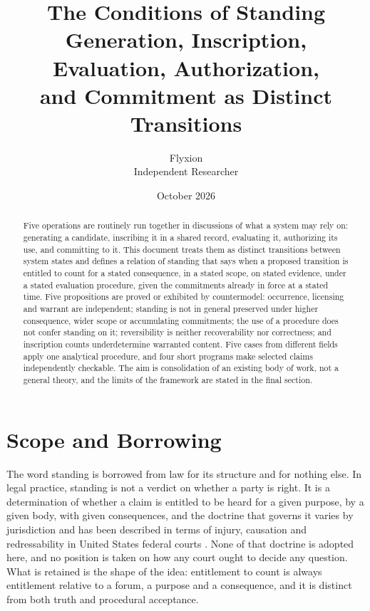 \documentclass[11pt]{article}
\title{The Conditions of Standing\\[0.4em]
\large Generation, Inscription, Evaluation, Authorization,\\and Commitment as Distinct Transitions}
\author{Flyxion\\Independent Researcher}
\date{October 2026}
\theoremstyle{remark}
\begin{document}
\maketitle

\begin{abstract}
\noindent
Five operations are routinely run together in discussions of what a system may rely on: generating a candidate, inscribing it in a shared record, evaluating it, authorizing its use, and committing to it. This document treats them as distinct transitions between system states and defines a relation of standing that says when a proposed transition is entitled to count for a stated consequence, in a stated scope, on stated evidence, under a stated evaluation procedure, given the commitments already in force at a stated time. Five propositions are proved or exhibited by countermodel: occurrence, licensing and warrant are independent; standing is not in general preserved under higher consequence, wider scope or accumulating commitments; the use of a procedure does not confer standing on it; reversibility is neither recoverability nor correctness; and inscription counts underdetermine warranted content. Five cases from different fields apply one analytical procedure, and four short programs make selected claims independently checkable. The aim is consolidation of an existing body of work, not a general theory, and the limits of the framework are stated in the final section.
\end{abstract}

\section*{Scope and Borrowing}

The word standing is borrowed from law for its structure and for nothing else. In legal practice, standing is not a verdict on whether a party is right. It is a determination of whether a claim is entitled to be heard for a given purpose, by a given body, with given consequences, and the doctrine that governs it varies by jurisdiction and has been described in terms of injury, causation and redressability in United States federal courts \cite{lujan}. None of that doctrine is adopted here, and no position is taken on how any court ought to decide any question. What is retained is the shape of the idea: entitlement to count is always entitlement relative to a forum, a purpose and a consequence, and it is distinct from both truth and procedural acceptance.
\end{document}
